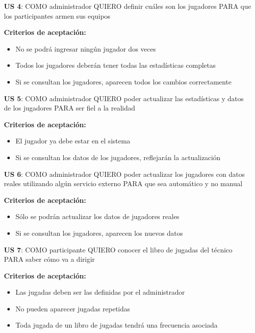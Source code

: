\begin{tcolorbox}
\textbf{US 4}: COMO administrador QUIERO definir cuáles son los jugadores PARA que los participantes armen sus equipos

\vline

\textbf{Criterios de aceptación:}
\begin{itemize}
\item No se podrá ingresar ningún jugador dos veces 
\item Todos los jugadores deberán tener todas las estadísticas completas 
\item Si se consultan los jugadores, aparecen todos los cambios correctamente 
\end{itemize}
\end{tcolorbox}
\vspace{10pt}


\begin{tcolorbox}
\textbf{US 5}: COMO administrador QUIERO poder actualizar las estadísticas y datos de los jugadores PARA ser fiel a la realidad

\vline

\textbf{Criterios de aceptación:}
\begin{itemize}
\item El jugador ya debe estar en el sistema 
\item Si se consultan los datos de los jugadores, reflejarán la actualización
\end{itemize}
\end{tcolorbox}
\vspace{10pt}


\begin{tcolorbox}
\textbf{US 6}: COMO administrador QUIERO poder actualizar los jugadores con datos reales utilizando algún servicio externo PARA que sea automático y no manual

\vline

\textbf{Criterios de aceptación:}
\begin{itemize}
\item Sólo se podrán actualizar los datos de jugadores reales
\item Si se consultan los jugadores, aparecen los nuevos datos 
\end{itemize}
\end{tcolorbox}
\vspace{10pt}


\begin{tcolorbox}
\textbf{US 7}: COMO participante QUIERO conocer el libro de jugadas del técnico PARA saber cómo va a dirigir

\vline

\textbf{Criterios de aceptación:}
\begin{itemize}
\item Las jugadas deben ser las definidas por el administrador
\item No pueden aparecer jugadas repetidas
\item Toda jugada de un libro de jugadas tendrá una frecuencia asociada
\end{itemize}
\end{tcolorbox}
\vspace{10pt}


